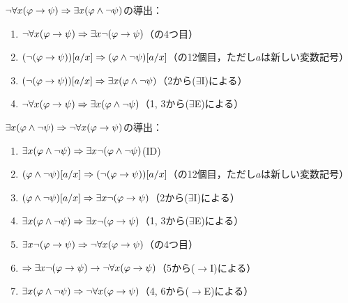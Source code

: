 \(\lnot \forall x \paren{\varphi \to \psi} \sequent \exists x \paren{\varphi \land \lnot \psi}\)の導出：
\begin{enumerate}
	\item \(\lnot \forall x \paren{\varphi \to \psi} \sequent \exists x \lnot \paren{\varphi \to \psi}\)\quad （の4つ目）
	\item \(\subst{\paren{\lnot \paren{\varphi \to \psi}}}{a/x} \sequent \subst{\paren{\varphi \land \lnot \psi}}{a/x}\)\quad （の12個目，ただし\(a\)は新しい変数記号）
	\item \(\subst{\paren{\lnot \paren{\varphi \to \psi}}}{a/x} \sequent \exists x \paren{\varphi \land \lnot \psi}\)\quad （2から(\(\exists\)I)による）
	\item \(\lnot \forall x \paren{\varphi \to \psi} \sequent \exists x \paren{\varphi \land \lnot \psi}\)\quad （1, 3から(\(\exists\)E)による）
\end{enumerate}

\(\exists x \paren{\varphi \land \lnot \psi} \sequent \lnot \forall x \paren{\varphi \to \psi}\)の導出：
\begin{enumerate}
	\item \(\exists x \paren{\varphi \land \lnot \psi} \sequent \exists x \lnot \paren{\varphi \land \lnot \psi}\)\quad (ID)
	\item \(\subst{\paren{\varphi \land \lnot \psi}}{a/x} \sequent \subst{\paren{\lnot \paren{\varphi \to \psi}}}{a/x}\)\quad （の12個目，ただし\(a\)は新しい変数記号）
	\item \(\subst{\paren{\varphi \land \lnot \psi}}{a/x} \sequent \exists x \lnot \paren{\varphi \to \psi}\)\quad （2から(\(\exists\)I)による）
	\item \(\exists x \paren{\varphi \land \lnot \psi} \sequent \exists x \lnot \paren{\varphi \to \psi}\)\quad （1, 3から(\(\exists\)E)による）
	\item \(\exists x \lnot \paren{\varphi \to \psi} \sequent \lnot \forall x \paren{\varphi \to \psi}\)\quad （の4つ目）
	\item \(\sequent \exists x \lnot \paren{\varphi \to \psi} \to \lnot \forall x \paren{\varphi \to \psi}\)\quad （5から(\(\to\)I)による）
	\item \(\exists x \paren{\varphi \land \lnot \psi} \sequent \lnot \forall x \paren{\varphi \to \psi}\)\quad （4, 6から(\(\to\)E)による）
\end{enumerate}

